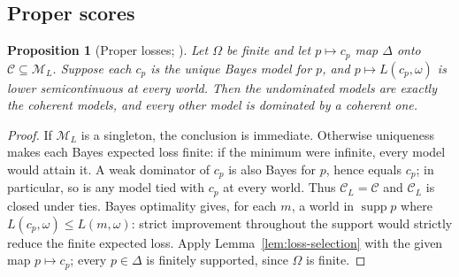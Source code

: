\documentclass[11pt]{article}
\newtheorem{proposition}[theorem]{Proposition}
\theoremstyle{definition}
\theoremstyle{remark}
\newcommand{\M}{\mathcal M}
\newcommand{\C}{\mathcal C}
\newcommand{\supp}{\operatorname{supp}}
\begin{document}
\subsection{Proper scores}
\begin{proposition}[Proper losses; {\cite{Predd2009,Pettigrew2022}}]\label{prop:short-proper}
Let $\Omega$ be finite and let $p\mapsto c_p$ map $\Delta$ onto $\C\subseteq\M_L$. Suppose each $c_p$ is the unique Bayes model for $p$, and $p\mapsto L(c_p,\omega)$ is lower semicontinuous at every world. Then the undominated models are exactly the coherent models, and every other model is dominated by a coherent one.
\end{proposition}
\begin{proof}
If $\M_L$ is a singleton, the conclusion is immediate. Otherwise uniqueness makes each Bayes expected loss finite: if the minimum were infinite, every model would attain it. {A weak dominator of $c_p$ is also Bayes for $p$, hence equals $c_p$; in particular, so is any model tied with $c_p$ at every world. Thus $\C_L=\C$ and $\C_L$ is closed under ties. Bayes optimality gives, for each $m$, a world in $\supp p$ where $L(c_p,\omega)\le L(m,\omega)$: strict improvement throughout the support would strictly reduce the finite expected loss. Apply Lemma~\ref{lem:loss-selection} with the given map $p\mapsto c_p$; every $p\in\Delta$ is finitely supported, since $\Omega$ is finite.}
\end{proof}
\end{document}
